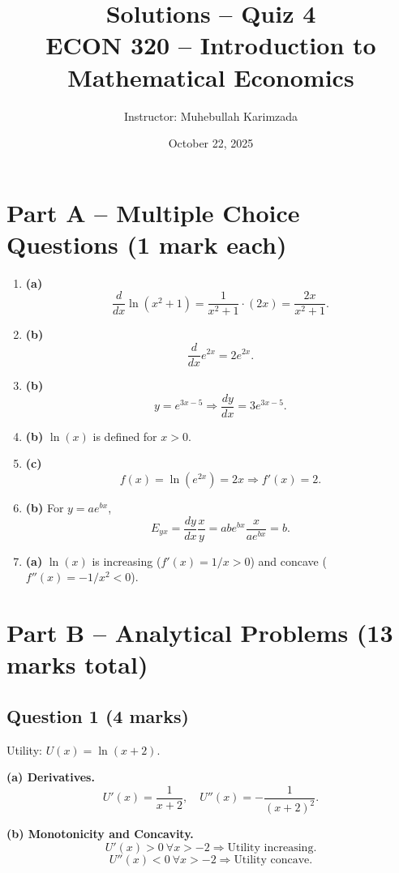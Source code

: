 \documentclass[12pt]{article}
\title{Solutions -- Quiz 4\\ \vspace{10pt}
\large ECON 320 -- Introduction to Mathematical Economics}
\author{Instructor: Muhebullah Karimzada}
\date{October 22, 2025}
\begin{document}
\maketitle

\section*{Part A – Multiple Choice Questions (1 mark each)}

\begin{enumerate}
\item \textbf{(a)} 
\[
\frac{d}{dx}\ln(x^2+1)=\frac{1}{x^2+1}\cdot(2x)=\frac{2x}{x^2+1}.
\]

\item \textbf{(b)} 
\[
\frac{d}{dx}e^{2x}=2e^{2x}.
\]

\item \textbf{(b)} 
\[
y=e^{3x-5}\Rightarrow \frac{dy}{dx}=3e^{3x-5}.
\]

\item \textbf{(b)}  
\(\ln(x)\) is defined for \(x>0\).

\item \textbf{(c)}  
\[
f(x)=\ln(e^{2x})=2x \Rightarrow f'(x)=2.
\]

\item \textbf{(b)}  
For \(y=ae^{bx}\),
\[
E_{yx}=\frac{dy}{dx}\frac{x}{y}=abe^{bx}\frac{x}{ae^{bx}}=b.
\]

\item \textbf{(a)}  
\(\ln(x)\) is increasing (\(f'(x)=1/x>0\)) and concave (\(f''(x)=-1/x^2<0\)).

\end{enumerate}

\newpage

\section*{Part B – Analytical Problems (13 marks total)}

\subsection*{Question 1 (4 marks)}

Utility: \(U(x)=\ln(x+2)\).

\textbf{(a) Derivatives.}
\[
U'(x)=\frac{1}{x+2}, \quad U''(x)=-\frac{1}{(x+2)^2}.
\]

\textbf{(b) Monotonicity and Concavity.}
\[
U'(x)>0 \ \forall x>-2 \Rightarrow \text{Utility increasing.}
\]
\[
U''(x)<0 \ \forall x>-2 \Rightarrow \text{Utility concave.}
\]
\end{document}
